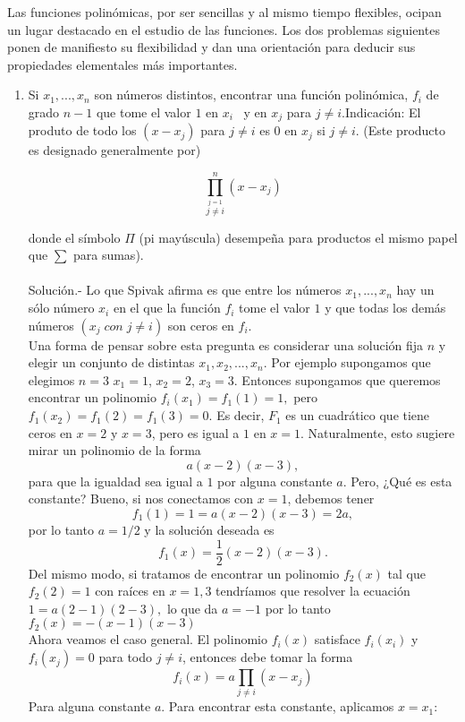 \begin{ej} Las funciones polinómicas, por ser sencillas y al mismo tiempo flexibles, ocipan un lugar destacado en el estudio de las funciones. Los dos problemas siguientes ponen de manifiesto su flexibilidad y dan una orientación para deducir sus propiedades elementales más importantes.
\begin{enumerate}[\bfseries a)]
\item Si $x_1, ..., x_n$ son números distintos, encontrar una función polinómica, $f_i$ de grado $n-1$ que tome el valor $1$ en $x_i$ \, y  en $x_j$ para $j \neq i$.Indicación: El produto de todo los $(x-x_j)$ para $j\neq i$ es $0$ en $x_j$ si $j\neq i$. (Este producto es designado generalmente por)
\begin{center}
\[
\prod_{\overset{j=1}{j \neq i}}^{n} (x-x_j) 
\]
\end{center}
donde el símbolo $\Pi$ (pi mayúscula) desempeña para productos el mismo papel que $\sum$ para sumas).\\\\
Solución.- \; Lo que Spivak afirma es que entre los números $x_1, ..., x_n$ hay un sólo número $x_i$ en el que la función $f_i$ tome el valor $1$ y que todas los demás números $(x_j \; con \; j\neq i)$ son ceros en $f_i$.\\
Una forma de pensar sobre esta pregunta es considerar una solución fija $n$ y elegir un conjunto de distintas $x_1, x_2, ..., x_n$. Por ejemplo supongamos que elegimos $n=3$ $x_1=1$, $x_2=2$, $x_3 = 3.$ Entonces supongamos que queremos encontrar un polinomio $f_i(x_1)=f_1(1)=1,$ pero $f_1(x_2)=f_1(2)=f_1(3)=0.$ Es decir, $F_1$ es un cuadrático que tiene ceros en $x=2$ \; y\; $x=3$, pero es igual a $1$ en $x=1.$ Naturalmente, esto sugiere mirar un polinomio de la forma $$a(x-2)(x-3),$$ para que la igualdad sea igual a $1$ por alguna constante $a.$ Pero, ¿Qué es esta constante? Bueno, si nos conectamos con $x=1$, debemos tener $$f_1(1)=1=a(x-2)(x-3)=2a,$$ por lo tanto $a=1/2$ y la solución deseada es $$f_1(x)=\dfrac{1}{2}(x-2)(x-3).$$ Del mismo modo, si tratamos de encontrar un polinomio $f_2(x)$ tal que $f_2(2)=1$ con raíces en $x=1,3$ tendríamos que resolver la ecuación $1=a(2-1)(2-3),$ lo que da $a=-1$ por lo tanto $f_2(x)=-(x-1)(x-3)$\\
Ahora veamos el caso general. El polinomio $f_i(x)$ satisface $f_i(x_i)$ \; y \; $f_i(x_j)=0$ para todo $j \neq i$, entonces debe tomar la forma 
\[
f_i(x)=a \prod_{j \neq i} (x-x_j) 
\]
Para alguna constante $a$. Para encontrar esta constante, aplicamos $x=x_1$: 

\end{enumerate}
\end{ej}
